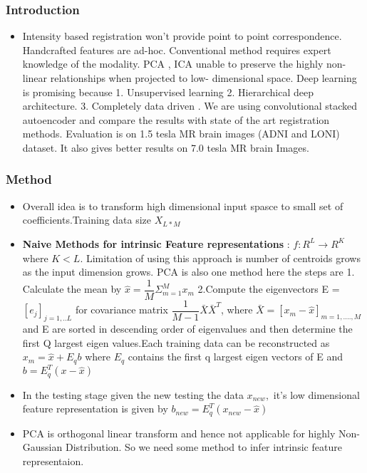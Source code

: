 \documentclass{beamer}
\begin{document}
\begin{frame}
\frametitle{Introduction}

\begin{itemize} 
\item Intensity based registration won't provide point to point correspondence. Handcrafted features are ad-hoc. Conventional method requires expert knowledge of the modality. PCA , ICA unable to preserve the highly non-linear relationships when projected to low- dimensional space. Deep learning is promising because 1. Unsupervised learning 2. Hierarchical deep architecture. 3. Completely data driven .  We are using convolutional stacked autoencoder and compare the results with state of the art registration methods. Evaluation is on 1.5 tesla MR brain images (ADNI and LONI) dataset. It also gives better results on 7.0 tesla MR brain Images. \\ 

\end{itemize}
\end{frame}


\begin{frame}
\frametitle{Method}
\begin{itemize}
\item Overall idea is to transform high dimensional input spasce to small set of coefficients.Training data size $X_{L*M}$
\item \textbf{Naive Methods for intrinsic Feature representations} : $f : R^{L}\longrightarrow R^{K} $ where $K < L$. Limitation of using this approach is number of centroids grows as the input dimension grows. PCA is also one method here the steps are 1. Calculate the mean by $\hat{x} = \dfrac{1}{M}\Sigma_{m=1}^{M} x_{m}$ 2.Compute the eigenvectors E = $[e_{j}]_{j=1,..L}$ for covariance matrix $\dfrac{1}{M-1} \bar{X} \bar{X}^{T}$, where $\bar{X} = [x_{m} - \hat{x}]_{m=1,....,M}$ and E are sorted in descending order of eigenvalues and then determine the first Q largest eigen values.Each training data can be reconstructed as $x_{m} = \hat{x} + E_{q} b $ where $E_{q} $ contains the first q largest eigen vectors of E and $b= E_{q}^{T}(x - \hat{x}) $

\end{itemize}
\end{frame}



\begin{frame}
\begin{itemize}
\item In the testing stage given the new testing the data $x_{new},$ it's low dimensional feature representation is given by $b_{new} = E_{q}^{T}(x_{new} - \hat{x})$
\item PCA is orthogonal linear transform and hence not applicable for highly Non- Gaussian Distribution. So we need some method to infer intrinsic feature representaion.

\end{itemize}
\end{frame}
\end{document}
